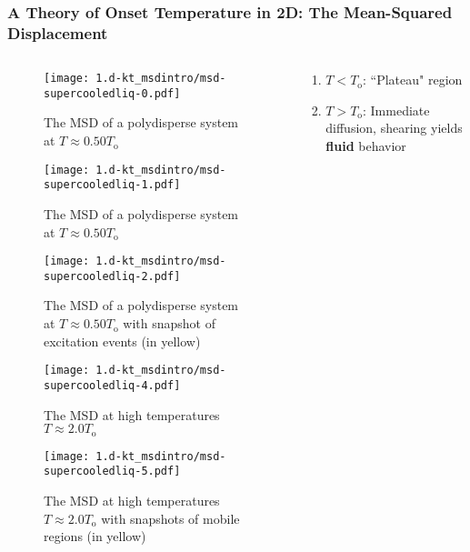 
\begin{frame}[c]\label{c.1}
\frametitle{A Theory of Onset Temperature in 2D: The Mean-Squared Displacement}


\begin{columns}[T]
\begin{column}[T]{0.4\textwidth}
\vspace{-12pt}
\begin{figure}[t]
\begin{overprint}

\texttt{[image: 1.d-kt\_msdintro/msd-supercooledliq-0.pdf]}\caption{The MSD of a polydisperse system at $ T \approx 0.50 T_\mathrm{o}$}


\texttt{[image: 1.d-kt\_msdintro/msd-supercooledliq-1.pdf]}\caption{The MSD of a polydisperse system at $ T \approx 0.50 T_\mathrm{o}$}

\texttt{[image: 1.d-kt\_msdintro/msd-supercooledliq-2.pdf]}\caption{The MSD of a polydisperse system at $ T \approx 0.50 T_\mathrm{o}$ with snapshot of excitation events (in yellow)}




\texttt{[image: 1.d-kt\_msdintro/msd-supercooledliq-4.pdf]}\caption{The MSD at high temperatures $T \approx 2.0 T_\mathrm{o}$}


\texttt{[image: 1.d-kt\_msdintro/msd-supercooledliq-5.pdf]}\caption{The MSD at high temperatures $T \approx 2.0 T_\mathrm{o}$ with snapshots of mobile regions (in yellow)}


\end{overprint}
\end{figure}


\end{column}

\begin{column}[T]{0.6\textwidth}



\begin{enumerate}
\item<4-> $T < T_\mathrm{o}$: ``Plateau" region %
\item<7-> $T > T_\mathrm{o}$: Immediate diffusion, shearing yields \textbf{fluid} behavior 
\end{enumerate}


\end{column}
\end{columns}
\end{frame}
